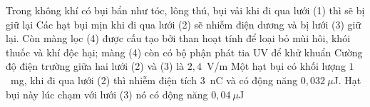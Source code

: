 \begin{ex}
\begin{center}
		\end{center}
		\choiceTFt
		{\True Trong không khí có bụi bẩn như tóc, lông thú, bụi vải khi đi qua lưới (1) thì sẽ bị giữ lại}
		{\True Các hạt bụi mịn khi đi qua lưới (2) sẽ nhiễm điện dương và bị lưới (3) giữ lại. Còn màng lọc (4) được cấu tạo bởi than hoạt tính để loại bỏ mùi hôi, khói thuốc và khí độc hại; màng (4) còn có bộ phận phát tia UV để khử khuẩn}
		{Cường độ điện trường giữa hai lưới (2) và (3) là $2{,}4$~V/m}
		{Một hạt bụi có khối lượng $1$~mg, khi đi qua lưới (2) thì nhiễm điện tích $3$~nC và có động năng $0{,}032~\mu$J. Hạt bụi này lúc chạm với lưới (3) nó có động năng $0{,}04~\mu$J}
	\end{ex}

